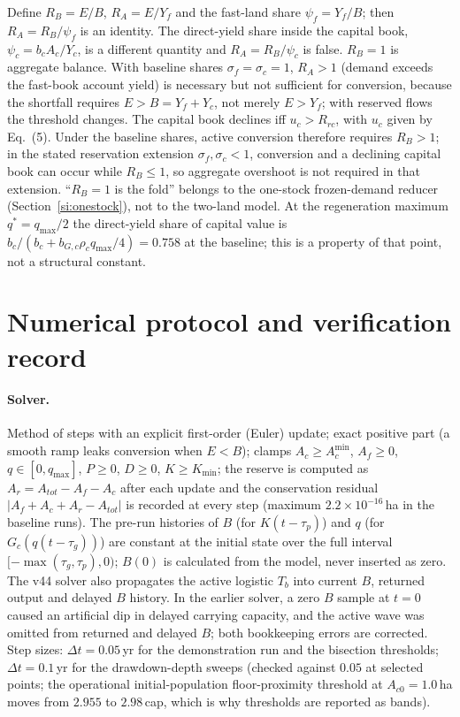 \documentclass[11pt,a4paper]{article}
\newcommand{\Acmin}{A_c^{\min}}
\begin{document}
Define $R_B=E/B$, $R_A=E/Y_f$ and the fast-land share $\psi_f=Y_f/B$; then $R_A=R_B/\psi_f$ is an identity. The direct-yield share inside the capital book, $\psi_c=b_cA_c/Y_c$, is a different quantity and $R_A=R_B/\psi_c$ is false. $R_B=1$ is aggregate balance. With baseline shares $\sigma_f=\sigma_c=1$, $R_A>1$ (demand exceeds the fast-book account yield) is necessary but not sufficient for conversion, because the shortfall requires $E>B=Y_f+Y_c$, not merely $E>Y_f$; with reserved flows the threshold changes. The capital book declines iff $u_c>R_{rc}$, with $u_c$ given by Eq.~(5). Under the baseline shares, active conversion therefore requires $R_B>1$; in the stated reservation extension $\sigma_f,\sigma_c<1$, conversion and a declining capital book can occur while $R_B\le1$, so aggregate overshoot is not required in that extension. ``$R_B=1$ is the fold'' belongs to the one-stock frozen-demand reducer (Section~\ref{si:onestock}), not to the two-land model. At the regeneration maximum $q^*=q_{\max}/2$ the direct-yield share of capital value is $b_c/(b_c+b_{G,c}\rho_cq_{\max}/4)=0.758$ at the baseline; this is a property of that point, not a structural constant.
\section{Numerical protocol and verification record}\label{si:numerics}

\paragraph{Solver.} Method of steps with an explicit first-order (Euler) update; exact positive part (a smooth ramp leaks conversion when $E<B$); clamps $A_c\ge\Acmin$, $A_f\ge0$, $q\in[0,q_{\max}]$, $P\ge0$, $D\ge0$, $K\ge K_{\min}$; the reserve is computed as $A_r=A_{tot}-A_f-A_c$ after each update and the conservation residual $|A_f+A_c+A_r-A_{tot}|$ is recorded at every step (maximum $2.2\times10^{-16}$\,ha in the baseline runs). The pre-run histories of $B$ (for $K(t-\tau_p)$) and $q$ (for $G_c(q(t-\tau_g))$) are constant at the initial state over the full interval $[-\max(\tau_g,\tau_p),0)$; $B(0)$ is calculated from the model, never inserted as zero. The v44 solver also propagates the active logistic $T_b$ into current $B$, returned output and delayed $B$ history. In the earlier solver, a zero $B$ sample at $t=0$ caused an artificial dip in delayed carrying capacity, and the active wave was omitted from returned and delayed $B$; both bookkeeping errors are corrected. Step sizes: $\Delta t=0.05$\,yr for the demonstration run and the bisection thresholds; $\Delta t=0.1$\,yr for the drawdown-depth sweeps (checked against $0.05$ at selected points; the operational initial-population floor-proximity threshold at $A_{c0}=1.0$\,ha moves from $2.955$ to $2.98$\,cap, which is why thresholds are reported as bands).
\end{document}
